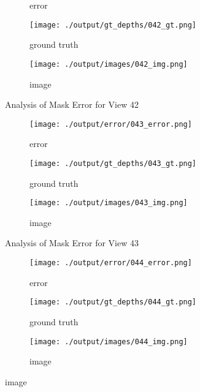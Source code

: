 \documentclass{article}
\begin{document}
\begin{figure}
\begin{subfigure}{0.3\textwidth}
		\caption{error}
		\label{fig:error42}
	\end{subfigure}
	\hfill
	\centering
	\begin{subfigure}{0.3\textwidth}
		\centering
		\texttt{[image: ./output/gt\_depths/042\_gt.png]}
		\caption{ground truth}
		\label{fig:gt42}
	\end{subfigure}
	\hfill
	\centering
	\begin{subfigure}{0.3\textwidth}
		\centering
		\texttt{[image: ./output/images/042\_img.png]}
		\caption{image}
		\label{fig:img42}
	\end{subfigure}
	\hfill
	\caption{Analysis of Mask Error for View 42}
	\label{fig:error_analys42}
\end{figure}\begin{figure}
	\centering
	\begin{subfigure}{0.3\textwidth}
		\centering
		\texttt{[image: ./output/error/043\_error.png]}
		\caption{error}
		\label{fig:error43}
	\end{subfigure}
	\hfill
	\centering
	\begin{subfigure}{0.3\textwidth}
		\centering
		\texttt{[image: ./output/gt\_depths/043\_gt.png]}
		\caption{ground truth}
		\label{fig:gt43}
	\end{subfigure}
	\hfill
	\centering
	\begin{subfigure}{0.3\textwidth}
		\centering
		\texttt{[image: ./output/images/043\_img.png]}
		\caption{image}
		\label{fig:img43}
	\end{subfigure}
	\hfill
	\caption{Analysis of Mask Error for View 43}
	\label{fig:error_analys43}
\end{figure}\begin{figure}
	\centering
	\begin{subfigure}{0.3\textwidth}
		\centering
		\texttt{[image: ./output/error/044\_error.png]}
		\caption{error}
		\label{fig:error44}
	\end{subfigure}
	\hfill
	\centering
	\begin{subfigure}{0.3\textwidth}
		\centering
		\texttt{[image: ./output/gt\_depths/044\_gt.png]}
		\caption{ground truth}
		\label{fig:gt44}
	\end{subfigure}
	\hfill
	\centering
	\begin{subfigure}{0.3\textwidth}
		\centering
		\texttt{[image: ./output/images/044\_img.png]}
		\caption{image}
		\label{fig:img44}
	\end{subfigure}

\end{figure}
\end{document}
